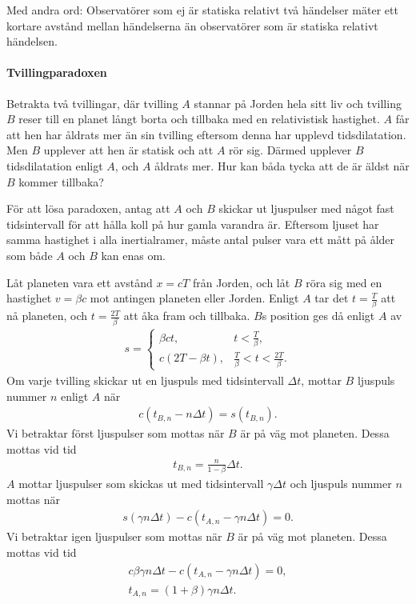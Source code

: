 Med andra ord: Observatörer som ej är statiska relativt två händelser mäter ett kortare avstånd mellan händelserna än observatörer som är statiska relativt händelsen.

\paragraph{Tvillingparadoxen}
Betrakta två tvillingar, där tvilling $A$ stannar på Jorden hela sitt liv och tvilling $B$ reser till en planet långt borta och tillbaka med en relativistisk hastighet. $A$ får att hen har åldrats mer än sin tvilling eftersom denna har upplevd tidsdilatation. Men $B$ upplever att hen är statisk och att $A$ rör sig. Därmed upplever $B$ tidsdilatation enligt $A$, och $A$ åldrats mer. Hur kan båda tycka att de är äldst när $B$ kommer tillbaka?

För att lösa paradoxen, antag att $A$ och $B$ skickar ut ljuspulser med något fast tidsintervall för att hålla koll på hur gamla varandra är. Eftersom ljuset har samma hastighet i alla inertialramer, måste antal pulser vara ett mått på ålder som både $A$ och $B$ kan enas om.

Låt planeten vara ett avstånd $x = cT$ från Jorden, och låt $B$ röra sig med en hastighet $v = \beta c$ mot antingen planeten eller Jorden. Enligt $A$ tar det $t = \frac{T}{\beta}$ att nå planeten, och $t = \frac{2T}{\beta}$ att åka fram och tillbaka. $B$s position ges då enligt $A$ av
\begin{align*}
	s =
	\begin{cases}
		\beta ct,       &t < \frac{T}{\beta}, \\
		c(2T - \beta t), &\frac{T}{\beta} < t < \frac{2T}{\beta}.
	\end{cases}
\end{align*}
Om varje tvilling skickar ut en ljuspuls med tidsintervall $\Delta t$, mottar $B$ ljuspuls nummer $n$ enligt $A$ när
\begin{align*}
	c(t_{B, n} - n\Delta t) = s(t_{B, n}).
\end{align*}
Vi betraktar först ljuspulser som mottas när $B$ är på väg mot planeten. Dessa mottas vid tid
\begin{align*}
	t_{B, n} = \frac{n}{1 - \beta}\Delta t. 
\end{align*}
$A$ mottar ljuspulser som skickas ut med tidsintervall $\gamma\Delta t$ och ljuspuls nummer $n$ mottas när
\begin{align*}
	s(\gamma n\Delta t) - c(t_{A, n} - \gamma n\Delta t) = 0.
\end{align*}
Vi betraktar igen ljuspulser som mottas när $B$ är på väg mot planeten. Dessa mottas vid tid
\begin{align*}
	c\beta\gamma n\Delta t - c(t_{A, n} - \gamma n\Delta t) = 0, \\
	t_{A, n} = (1 + \beta)\gamma n\Delta t.
\end{align*}

